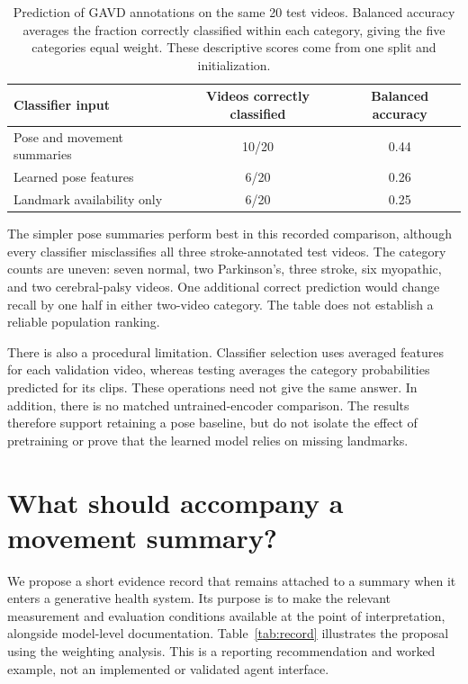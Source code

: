 \documentclass{article}
\begin{document}
\begin{table}[h]
\centering
\caption{Prediction of GAVD annotations on the same 20 test videos. Balanced accuracy averages the fraction correctly classified within each category, giving the five categories equal weight. These descriptive scores come from one split and initialization.}
\label{tab:classification}
\begin{tabular}{lcc}
\toprule
Classifier input & Videos correctly classified & Balanced accuracy\\
\midrule
Pose and movement summaries & 10/20 & 0.44\\
Learned pose features & 6/20 & 0.26\\
Landmark availability only & 6/20 & 0.25\\
\bottomrule
\end{tabular}
\end{table}

The simpler pose summaries perform best in this recorded comparison, although every classifier misclassifies all three stroke-annotated test videos. The category counts are uneven: seven normal, two Parkinson's, three stroke, six myopathic, and two cerebral-palsy videos. One additional correct prediction would change recall by one half in either two-video category. The table does not establish a reliable population ranking.

There is also a procedural limitation. Classifier selection uses averaged features for each validation video, whereas testing averages the category probabilities predicted for its clips. These operations need not give the same answer. In addition, there is no matched untrained-encoder comparison. The results therefore support retaining a pose baseline, but do not isolate the effect of pretraining or prove that the learned model relies on missing landmarks.

\section{What should accompany a movement summary?}

We propose a short evidence record that remains attached to a summary when it enters a generative health system. Its purpose is to make the relevant measurement and evaluation conditions available at the point of interpretation, alongside model-level documentation. Table~\ref{tab:record} illustrates the proposal using the weighting analysis. This is a reporting recommendation and worked example, not an implemented or validated agent interface.
\end{document}
